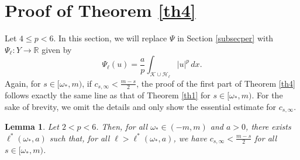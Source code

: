 \documentclass[11pt]{amsart}
\newtheorem{lemma}[theorem]{Lemma}
\newcommand{\K}{\mathcal{K}}
\numberwithin{equation}{section}
\begin{document}
\section{Proof of Theorem \ref{th4}}\label{sect6}
 Let $4 \leq p <6$. In this section, we will replace $\Psi$ in Section \ref{subsecper} with $\Psi_\ell : Y \to \mathbb{R}$ given by
 \[
    \Psi_\ell(u) = \frac{a}{p}\int_{\K\cup\mathcal{H}_\ell}|u|^{p}\,dx.
 \]
 Again, for $s \in [\omega_*,m)$, if $c_{s,\infty} < \frac{m-s}{2}$, the proof of the first part of Theorem \ref{th4} follows exactly the same line as that of Theorem \ref{th1} for $s\in [\omega_*,m)$. For the sake of brevity, we omit the details and only show the essential estimate for $c_{s,\infty}$.
\begin{lemma}\label{lemcin46}
    Let $2 < p <6$. Then, for all $\omega_* \in (-m,m)$ and $a > 0$, there exists $\ell^*(\omega_*,a)$ such that, for all $\ell>\ell^*(\omega_*,a)$, we have $c_{s,\infty} < \frac{m-s}{2}$ for all $s\in [\omega_*,m)$.
\end{lemma}
\end{document}

